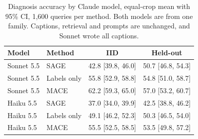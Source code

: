 \begin{table}[t]
\centering\small
\caption{Diagnosis accuracy by Claude model, equal-crop mean with 95\% CI, 1,600 queries per method. Both models are from one family. Captions, retrieval and prompts are unchanged, and Sonnet wrote all captions.}
\label{tab:table_A_cross_model}
\begin{tabular}{llcc}
\toprule
Model & Method & IID & Held-out \\
\midrule
Sonnet 5.5 & SAGE & 42.8 [39.8, 46.0] & 50.7 [46.8, 54.3] \\
Sonnet 5.5 & Labels only & 55.8 [52.9, 58.8] & 54.8 [51.0, 58.7] \\
Sonnet 5.5 & MACE & \cellcolor{bestgreen}62.2 [59.3, 65.0] & \cellcolor{bestgreen}57.0 [53.2, 60.7] \\
Haiku 5.5 & SAGE & 37.0 [34.0, 39.9] & 42.5 [38.8, 46.2] \\
Haiku 5.5 & Labels only & 49.1 [46.2, 52.3] & 50.3 [46.5, 54.0] \\
Haiku 5.5 & MACE & 55.5 [52.5, 58.5] & 53.5 [49.8, 57.2] \\
\bottomrule
\end{tabular}
\end{table}
